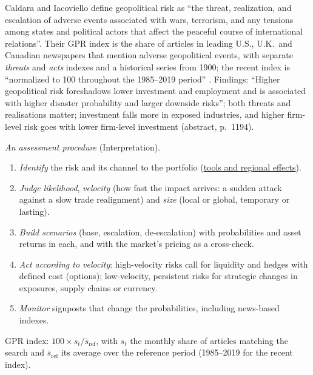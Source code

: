 \begin{qfmethod}\label{meth:geopolitical-risk-assessment}
 Caldara and Iacoviello define geopolitical risk as ``the threat, realization, and escalation of adverse events associated with wars, terrorism, and any tensions among states and political actors that affect the peaceful course of international relations''. Their GPR index is the share of articles in leading U.S., U.K.\ and Canadian newspapers that mention adverse geopolitical events, with separate \emph{threats} and \emph{acts} indexes and a historical series from 1900; the recent index is ``normalized to 100 throughout the 1985--2019 period'' \citep[introduction, pp.~1194--1196; Figure~1 notes, p.~1201]{caldara-iacoviello-2022}. Findings: ``Higher geopolitical risk foreshadows lower investment and employment and is associated with higher disaster probability and larger downside risks''; both threats and realisations matter; investment falls more in exposed industries, and higher firm-level risk goes with lower firm-level investment (abstract, p.~1194).

\emph{An assessment procedure} (Interpretation).
\begin{enumerate}
\item \emph{Identify} the risk and its channel to the portfolio (\hyperref[def:geopolitics-institutions-tools]{tools and regional effects}).
\item \emph{Judge likelihood}, \emph{velocity} (how fast the impact arrives: a sudden attack against a slow trade realignment) and \emph{size} (local or global, temporary or lasting).
\item \emph{Build scenarios} (base, escalation, de-escalation) with probabilities and asset returns in each, and with the market's pricing as a cross-check.
\item \emph{Act according to velocity}: high-velocity risks call for liquidity and hedges with defined cost (options); low-velocity, persistent risks for strategic changes in exposures, supply chains or currency.
\item \emph{Monitor} signposts that change the probabilities, including news-based indexes.
\end{enumerate}

 GPR index: $100\times s_t/\bar s_{\text{ref}}$, with $s_t$ the monthly share of articles matching the search and $\bar s_{\text{ref}}$ its average over the reference period (1985--2019 for the recent index).


\end{qfmethod}
